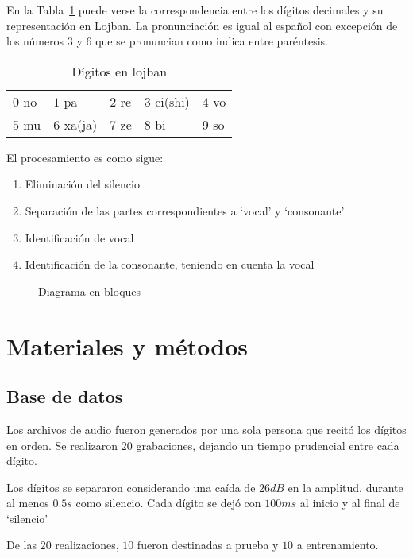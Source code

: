 \documentclass[conference,a4paper,10pt,oneside,final]{tfmpd}
\begin{document}
	En la Tabla~\ref{tab:digitos} puede verse la correspondencia entre los dígitos decimales
	y su representación en Lojban. La pronunciación es igual al español
	con excepción de los números $3$ y $6$ que se pronuncian como indica
	entre paréntesis.

	\begin{table}[h]
		\center
		\begin{tabular}{lllll}
			$0$ no & $1$ pa & $2$ re & $3$ ci(shi) & $4$ vo\\
			$5$ mu & $6$ xa(ja) & $7$ ze & $8$ bi & $9$ so\\
		\end{tabular}
		\caption{Dígitos en lojban}
		\label{tab:digitos}
	\end{table}


   	 El procesamiento es como sigue:
   	 \begin{enumerate}
   		 \item Eliminación del silencio
   		 \item Separación de las partes correspondientes a `vocal' y `consonante'
   		 \item Identificación de vocal
   		 \item Identificación de la consonante, teniendo en cuenta la vocal
   	 \end{enumerate}
	 \begin{figure}
		\resizebox{0.4\textwidth}{!}{
			
		}
		\caption{Diagrama en bloques}
	 \end{figure}
	

\section{Materiales y métodos}
	\subsection{Base de datos}
		Los archivos de audio fueron generados por una sola persona que recitó los dígitos en orden.
		Se realizaron $20$ grabaciones, dejando un tiempo prudencial entre cada dígito.

		Los dígitos se separaron considerando una caída de $26dB$ en la amplitud, durante al menos
		$0.5s$ como silencio. Cada dígito se dejó con $100ms$ al inicio y al final de `silencio'

		De las $20$ realizaciones, $10$ fueron destinadas a prueba y $10$ a entrenamiento.
\end{document}
